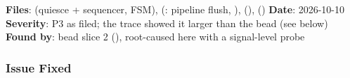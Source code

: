 \begin{record}

\textbf{Files}:  (quiesce + 
sequencer, FSM),  (:
pipeline flush, ), 
(), 
() \textbf{Date}: 2026-10-10 \textbf{Severity}: P3 as
filed; the trace showed it larger than the bead (see below)
\textbf{Found by}: bead  slice 2
(), root-caused here with a
signal-level probe

\end{record}

\subsubsection{Issue Fixed}\label{cr:fix:fixes-index:issue-fixed-8}

